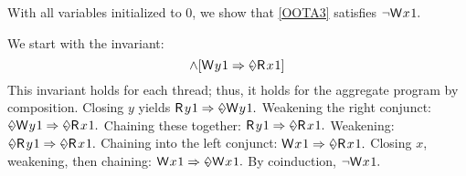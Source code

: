 \begin{example}
\label{ex:thin}
With all variables initialized to $0$, we show that \ref{OOTA3}
satisfies
\begin{math}
  \lnot\DW{x}{1}.
\end{math}

We start with the invariant:
\begin{displaymath}
  [\DW{x}{1}\Rightarrow\once\DR{y}{1}]
  \land
  [\DW{y}{1}\Rightarrow\once\DR{x}{1}]
\end{displaymath}
This invariant holds for each thread; thus, it holds for the
aggregate program by composition.  Closing $y$ yields
\begin{math}
  \DR{y}{1} \Rightarrow \once\DW{y}{1}.
\end{math}
Weakening the right conjunct: %
\begin{math}
  \once\DW{y}{1}\Rightarrow\once\DR{x}{1}.
\end{math}
Chaining these together: %
\begin{math}
  \DR{y}{1} \Rightarrow \once\DR{x}{1}.
\end{math}
Weakening:  %
\begin{math}
  \once\DR{y}{1} \allowbreak\Rightarrow \once\DR{x}{1}. 
\end{math}
Chaining into the left conjunct:  %
\begin{math}
  \DW{x}{1} \Rightarrow \once\DR{x}{1}. 
\end{math}
Closing $x$, 
weakening, 
then chaining: %
\begin{math}
  \DW{x}{1} \Rightarrow \once\DW{x}{1}. 
\end{math}
By coinduction, 
\begin{math}
  \lnot\DW{x}{1}.
\end{math}
\end{example}


